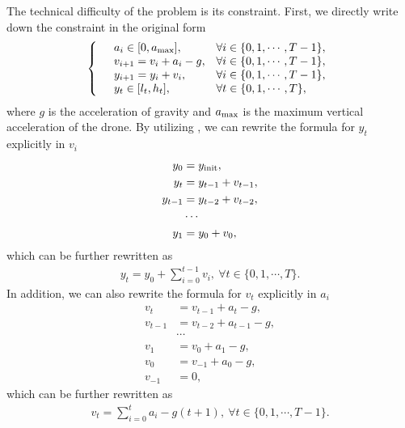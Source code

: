 \documentclass[letterpaper,10pt]{article}
\begin{document}
The technical difficulty of the problem is its constraint.
First, we directly write down the constraint in the original form
\begin{equation}
    \label{eq:original-constraint}
    \left\{
    \begin{array}{llll}
        & a_i \in [0, a_{\rm max}], & \forall i\in \{0,1,\cdots,T-1\},\\
        & v_{i+1} = v_i + a_i - g, & \forall i\in \{0,1,\cdots,T-1\},\\
        & y_{i+1} = y_i + v_i, & \forall i\in \{0,1,\cdots,T-1\},\\
        & y_{t} \in [l_t, h_t], & \forall t\in \{0,1,\cdots,T\},
    \end{array}\right.
\end{equation}
where $g$ is the acceleration of gravity and $a_{\rm max}$ is the maximum vertical acceleration of the drone.
By utilizing , we can rewrite the formula for $y_t$ explicitly in $v_i$
\begin{equation}
    \begin{split}
        y_0 &= y_{\rm init},\\
        y_t &= y_{t-1} + v_{t-1},\\
        y_{t-1} &= y_{t-2} + v_{t-2},\\
        &\cdots\\
        y_1 &= y_0 + v_0,
    \end{split}
\end{equation}
which can be further rewritten as
\begin{align}
    \label{eq:yt}
    y_t = y_0 + \sum_{i=0}^{t-1} v_i,~\forall t\in \{0,1,\cdots,T\}.
\end{align}
In addition, we can also rewrite the formula for $v_t$ explicitly in $a_i$
\begin{equation}
    \begin{split}
        v_t &= v_{t-1} + a_{t} - g,\\
        v_{t-1} &= v_{t-2} + a_{t-1} - g,\\
        &\cdots\\
        v_1 &= v_0 + a_1 - g,\\
        v_0 &= v_{-1} + a_0 - g,\\
        v_{-1} &= 0,
    \end{split}
\end{equation}
which can be further rewritten as
\begin{align}
    \label{eq:vt}
    v_t = \sum_{i=0}^{t} a_i - g (t+1),~\forall t\in \{0,1,\cdots,T-1\}.
\end{align}
\end{document}
